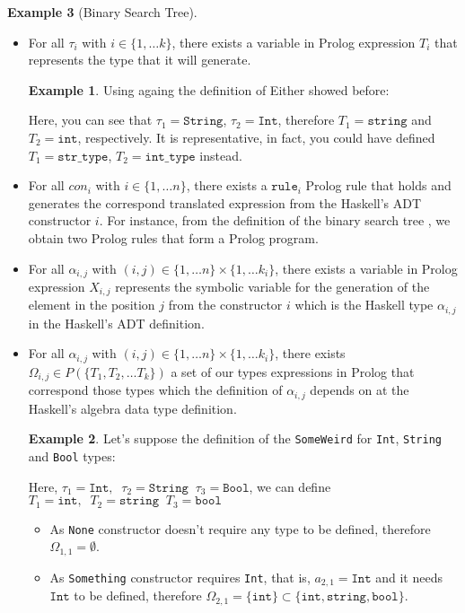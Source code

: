 \documentclass{report}
\theoremstyle{definition}
\newtheorem{example}{Example}[section]
\theoremstyle{definition}
\newcommand{\ttt}[1]{\texttt{#1}}
\newcommand{\tav}{\;\;}
\begin{document}
\begin{example}[Binary Search Tree]
\begin{itemize}
	\item For all $\tau_i$ with $i \in \{1, \ldots k \}$, there exists a variable in Prolog expression $T_i$ that represents the type that it will generate.
	\begin{example}
		Using againg the definition of Either showed before:
		
		Here, you can see that $\tau_1 = \ttt{String}$, $\tau_2 = \ttt{Int}$, therefore $T_1 = \ttt{string}$ and $T_2 = \ttt{int}$, respectively. It is representative, in fact, you could have defined $T_1 = \ttt{str\_type}$, $T_2 = \ttt{int\_type}$ instead.
	\end{example}
	\item For all $con_i$ with $i \in \{1, \ldots n \}$, there exists a $\ttt{rule}_i$ Prolog rule that holds and generates the correspond translated expression from the Haskell's ADT constructor $i$. For instance, from the definition of the binary search tree , we obtain two Prolog rules that form a Prolog program.
	\item For all $\alpha_{i,j}$ with $(i,j) \in \{1, \ldots n \} \times \{1, \ldots k_i \}$, there exists a variable in Prolog expression $X_{i,j}$ represents the symbolic variable for the generation of the element in the position $j$ from the constructor $i$ which is the Haskell type $\alpha_{i,j}$ in the Haskell's ADT definition.
	\item For all $\alpha_{i,j}$ with $(i,j) \in \{1, \ldots n \} \times \{1, \ldots k_i \}$, there exists $\Omega_{i,j} \in P(\{ T_1 , T_2, \ldots T_k \}) $ a set of our types expressions in Prolog that correspond those types which the definition of $\alpha_{i,j}$ depends on at the Haskell's algebra data type definition.
	\begin{example}
		Let's suppose the definition of the \ttt{SomeWeird} for \ttt{Int}, \ttt{String} and \ttt{Bool} types:
		
		Here, $\tau_1 = \ttt{Int}, \tav \tau_2=\ttt{String} \tav \tau_3=\ttt{Bool}$, we can define $T_1 = \ttt{int}, \tav T_2=\ttt{string} \tav T_3=\ttt{bool}$
		\begin{itemize}
			\item As \ttt{None} constructor doesn't require any type to be defined, therefore $\Omega_{1,1} = \emptyset$.
			\item As \ttt{Something} constructor requires \ttt{Int}, that is, $a_{2,1} = \ttt{Int}$ and it needs $\ttt{Int}$ to be defined, therefore $\Omega_{2,1} = \{\ttt{int}\} \subset \{ \ttt{int}, \ttt{string}, \ttt{bool} \}$.

\end{itemize}
\end{example}
\end{itemize}
\end{example}
\end{document}
